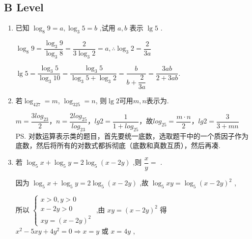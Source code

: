 \subsection*{B Level}
\begin{enumerate}
    
    \item 已知 ${\log }_{8}9 = a,{\log }_{3}5 = b$ ,试用 $a,b$ 表示 $\lg 5$ .
    \begin{jieda}
        ${\log }_{8}9 = \dfrac{{\log }_{3}9}{{\log }_{3}8} = \dfrac{2}{3{\log }_{3}2} = a,\therefore {\log }_{3}2 = \dfrac{2}{3a}$
        
        $\lg 5 = \dfrac{{\log }_{3}5}{{\log }_{3}{10}} = \dfrac{{\log }_{3}5}{{\log }_{3}5 + {\log }_{3}2} = \dfrac{b}{b + \dfrac{2}{3a}} = \dfrac{3ab}{2 + {3ab}}.$
    \end{jieda}
    \item 若$\log_427=m$, $\log_325=n$, 则$\lg2$可用$m,n$表示为. 
        \begin{jieda}
            $m = \dfrac{3log_23}{2}$，$n = \dfrac{2log_25}{log_23}$，$lg2 = \dfrac{1}{1+log_25}$，故$log_25 = \dfrac{m\cdot n}{2}$，$lg2 = \dfrac{3}{3+mn}$ \\
            \ps 对数运算表示类的题目，首先要统一底数，选取题干中的一个质因子作为底数，然后将所有的对数式都拆彻底（底数和真数互质），然后再凑.
        \end{jieda}
    \item 若 ${\log }_{5}x + {\log }_{5}y = 2{\log }_{5}\left( {x - {2y}}\right)$ ,则 $\dfrac{x}{y} =$ .
    \begin{jieda}
        因为 ${\log }_{5}x + {\log }_{5}y = 2{\log }_{5}\left( {x - {2y}}\right)$ ,故 ${\log }_{5}{xy} = {\log }_{5}{\left( x - 2y\right) }^{2}$ ,
        
        所以 $\left\{  \begin{matrix} x > 0,y > 0 \\  x - {2y} > 0 \\  {xy} = {\left( x - 2y\right) }^{2} \end{matrix}\right.$ ,由 ${xy} = {\left( x - 2y\right) }^{2}$ 得 ${x}^{2} - {5xy} + 4{y}^{2} = 0 \Longrightarrow  x = y$ 或 $x = {4y}$ ,
        

\end{jieda}
\end{enumerate}
